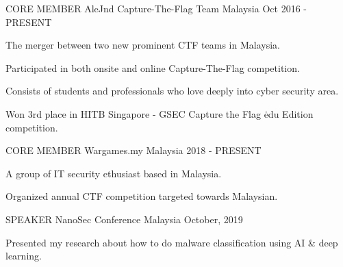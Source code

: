 

\begin{cventries}

    
    \cventry
    {CORE MEMBER}
    {AleJnd Capture-The-Flag Team}
    {Malaysia}
    {Oct 2016 - PRESENT}
    {
      \begin{cvitems}
        \item {The merger between two new prominent CTF teams in Malaysia.}
        \item {Participated in both onsite and online Capture-The-Flag competition.}
        \item {Consists of students and professionals who love deeply into cyber security area.}
        \item {Won 3rd place in HITB Singapore - GSEC Capture the Flag \.edu Edition competition.}
      \end{cvitems}
    }

    \cventry
    {CORE MEMBER}
    {Wargames.my}
    {Malaysia}
    {2018 - PRESENT}
    {
      \begin{cvitems}
        \item {A group of IT security ethusiast based in Malaysia.}
        \item {Organized annual CTF competition targeted towards Malaysian.}
      \end{cvitems}
    }

    \cventry
    {SPEAKER}
    {NanoSec Conference}
    {Malaysia}
    {October, 2019}
    {
      \begin{cvitems}
        \item {Presented my research about how to do malware classification using AI \& deep learning.}
      \end{cvitems}
    }
\end{cventries}
